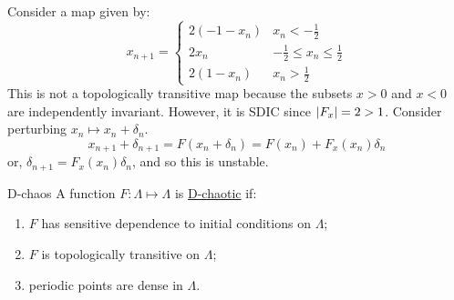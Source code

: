 \documentclass[../Main.tex]{subfiles}
\begin{document}
\begin{example}
    Consider a map given by:
    \begin{equation*}
        x_{n+1} =
        \begin{cases}
            2(-1-x_n) & x_n < -\frac12 \\
            2x_n & -\frac12 \leq x_n \leq \frac12 \\
            2(1-x_n) & x_n > \frac12
        \end{cases}
    \end{equation*}
    This is not a topologically transitive map because the subsets $x > 0$ and $x < 0$ are independently invariant. However, it is SDIC since $\left|F_x\right| = 2 > 1$. Consider perturbing $x_n \mapsto x_n + \delta_n$.
    \begin{equation*}
        x_{n+1} + \delta_{n+1} = F(x_n + \delta_n) = F(x_n) + F_x(x_n) \delta_n
    \end{equation*}
    or, $\delta_{n+1} = F_x(x_n) \delta_n$, and so this is unstable.
\end{example}
\begin{definition}{D-chaos}
    A function $F : \Lambda \mapsto \Lambda$ is \underline{D-chaotic} if:
    \begin{enumerate}
        \item $F$ has sensitive dependence to initial conditions on $\Lambda$;
        \item $F$ is topologically transitive on $\Lambda$;
        \item periodic points are dense in $\Lambda$.
    \end{enumerate}
\end{definition}
\end{document}
